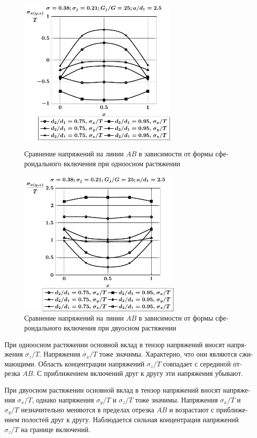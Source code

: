 \begin{russian}
\begin{figure}[h!]
\centering\footnotesize
\parbox[b]{7.5cm}{\centering\includegraphics[width=7.8cm]{periodic-inc27-d-a25-g25-t1.pdf}
\caption{Сравнение напряжений на линии $AB$ в зависимости от формы сфероидального включения при одноосном растяжении
\label{f:11:33}}}\hfil\hfil
\parbox[b]{7.5cm}{\centering\includegraphics[width=8cm]{periodic-inc27-d-a25-g25-t2.pdf}
\caption{Сравнение напряжений на линии $AB$ в зависимости от формы сфероидального включения при двуосном растяжении
\label{f:11:34}}}
\end{figure}

При одноосном растяжении основной вклад в тензор напряжений вносят напряжения $\sigma_z/T$. Напряжения $\sigma_x/T$ тоже значимы. Характерно, что они являются сжимающими. Область концентрации напряжений $\sigma_z/T$ совпадает с серединой отрезка $AB$. С приближением включений друг к другу эти напряжения убывают.

При двуосном растяжении основной вклад в тензор напряжений вносят напряжения $\sigma_x/T$, однако напряжения $\sigma_y/T$ и $\sigma_z/T$ тоже значимы. Напряжения $\sigma_x/T$ и $\sigma_y/T$ незначительно меняются в пределах отрезка $AB$ и возрастают с приближением полостей друг к другу. Наблюдается сильная концентрация напряжений $\sigma_z/T$ на границе включений.


\end{russian}

